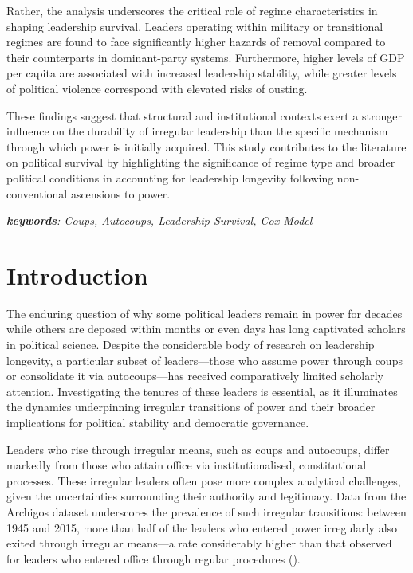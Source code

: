\documentclass[
  12pt,
]{report}
\begin{document}
Rather, the analysis underscores the critical role of regime
characteristics in shaping leadership survival. Leaders operating within
military or transitional regimes are found to face significantly higher
hazards of removal compared to their counterparts in dominant-party
systems. Furthermore, higher levels of GDP per capita are associated
with increased leadership stability, while greater levels of political
violence correspond with elevated risks of ousting.

These findings suggest that structural and institutional contexts exert
a stronger influence on the durability of irregular leadership than the
specific mechanism through which power is initially acquired. This study
contributes to the literature on political survival by highlighting the
significance of regime type and broader political conditions in
accounting for leadership longevity following non-conventional
ascensions to power.

\emph{\textbf{keywords}: Coups, Autocoups, Leadership Survival, Cox
Model}

\newpage

\section{Introduction}\label{introduction-3}

The enduring question of why some political leaders remain in power for
decades while others are deposed within months or even days has long
captivated scholars in political science. Despite the considerable body
of research on leadership longevity, a particular subset of
leaders---those who assume power through coups or consolidate it via
autocoups---has received comparatively limited scholarly attention.
Investigating the tenures of these leaders is essential, as it
illuminates the dynamics underpinning irregular transitions of power and
their broader implications for political stability and democratic
governance.

Leaders who rise through irregular means, such as coups and autocoups,
differ markedly from those who attain office via institutionalised,
constitutional processes. These irregular leaders often pose more
complex analytical challenges, given the uncertainties surrounding their
authority and legitimacy. Data from the Archigos dataset underscores the
prevalence of such irregular transitions: between 1945 and 2015, more
than half of the leaders who entered power irregularly also exited
through irregular means---a rate considerably higher than that observed
for leaders who entered office through regular procedures
().
\end{document}

